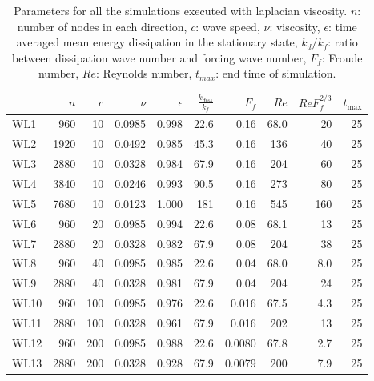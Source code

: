 \documentclass{jfm}
\begin{document}
\begin{table}
\begin{center}

\label{Table2}

\begin{tabular}{lrrrrrrrrr}
\toprule
{} &  $n$ &  $c$ &  $\nu $ &  $\epsilon$ &  $\frac{k_{diss}}{k_f}$ &   $F_f$ &  $\; Re$ &  $ReF_f^{2/3} $ &  $t_{\max}$ \\
\midrule
WL1  &  960 &   10 &   0.0985 &       0.998 &                    22.6 &   0.16 &  68.0 &           20 &          25 \\
WL2  & 1920 &   10 &   0.0492 &       0.985 &                    45.3 &    0.16 &  136 &           40 &          25 \\
WL3  & 2880 &   10 &   0.0328 &       0.984 &                    67.9 &    0.16 &    204 &           60 &          25 \\
WL4  & 3840 &   10 &   0.0246 &       0.993 &                    90.5 &   0.16 &   273 &            80 &          25 \\
WL5  & 7680 &   10 &   0.0123 &       1.000 &                     181 &   0.16 &   545 &           160 &          25 \\
WL6  &  960 &   20 &   0.0985 &       0.994 &                    22.6 &  0.08 &  68.1&            13 &          25 \\
WL7  & 2880 &   20 &   0.0328 &       0.982 &                    67.9 &    0.08 &  204 &           38 &          25 \\
WL8  &  960 &   40 &   0.0985 &       0.985 &                    22.6 &    0.04 &  68.0 &           8.0 &          25 \\
WL9  & 2880 &   40 &   0.0328 &       0.981 &                    67.9 &    0.04 &  204 &            24 &          25 \\
WL10 &  960 &  100 &   0.0985 &       0.976 &                    22.6 &   0.016 &  67.5 &            4.3 &          25 \\
WL11 & 2880 &  100 &   0.0328 &       0.961 &                    67.9 &  0.016 &  202 &           13 &          25 \\
WL12 &  960 &  200 &   0.0985 &       0.988 &                    22.6 & 0.0080 &  67.8 &          2.7 &          25 \\
WL13 & 2880 &  200 &   0.0328 &       0.928 &                    67.9 & 0.0079 &  200 &           7.9&          25 \\
\bottomrule
\end{tabular}

\caption{Parameters for all the simulations executed with laplacian viscosity.
$ n $: number of nodes in each direction, $ c $: wave speed, $ \nu  $:  viscosity, $ \epsilon $: time
averaged mean energy dissipation in the stationary state, $ k_{d}/ k_f $: ratio
between dissipation wave number and forcing wave number, $F_f $: Froude
number, $Re$: Reynolds number, $ t_{max} $: end time of simulation.}
\end{center}
\end{table}
\end{document}
